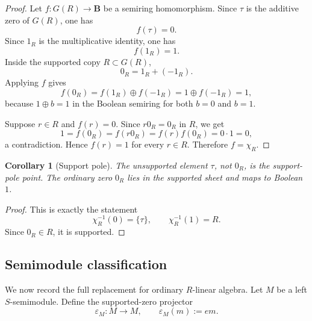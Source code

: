 \documentclass[11pt]{article}
\newcommand{\B}{\mathbf B}
\newcommand{\eps}{\varepsilon}
\newcommand{\1}{\mathbf 1}
\newtheorem{corollary}[theorem]{Corollary}
\numberwithin{equation}{section}
\begin{document}
\begin{proof}
Let $f:G(R)\to\B$ be a semiring homomorphism.  Since $\tau$ is the additive zero of $G(R)$, one has
\begin{equation}
  f(\tau)=0.
\end{equation}
Since $1_R$ is the multiplicative identity, one has
\begin{equation}
  f(1_R)=1.
\end{equation}
Inside the supported copy $R\subset G(R)$,
\begin{equation}
  0_R=1_R+(-1_R).
\end{equation}
Applying $f$ gives
\begin{equation}
  f(0_R)=f(1_R)\oplus f(-1_R)=1\oplus f(-1_R)=1,
\end{equation}
because $1\oplus b=1$ in the Boolean semiring for both $b=0$ and $b=1$.

Suppose $r\in R$ and $f(r)=0$.  Since $r0_R=0_R$ in $R$, we get
\begin{equation}
  1=f(0_R)=f(r0_R)=f(r)f(0_R)=0\cdot1=0,
\end{equation}
a contradiction.  Hence $f(r)=1$ for every $r\in R$.  Therefore $f=\chi_R$.
\end{proof}

\begin{corollary}[Support pole]\label{cor:support-pole}
The unsupported element $\tau$, not $0_R$, is the support-pole point.  The ordinary zero $0_R$ lies in the supported sheet and maps to Boolean $1$.
\end{corollary}

\begin{proof}
This is exactly the statement
\begin{equation}
  \chi_R^{-1}(0)=\{\tau\},
  \qquad
  \chi_R^{-1}(1)=R.
\end{equation}
Since $0_R\in R$, it is supported.
\end{proof}

\subsection{Semimodule classification}

We now record the full replacement for ordinary $R$-linear algebra.  Let $M$ be a left $S$-semimodule.  Define the supported-zero projector
\begin{equation}\label{eq:epsilonM}
  \eps_M:M\to M,
  \qquad
  \eps_M(m):=em.
\end{equation}
\end{document}
